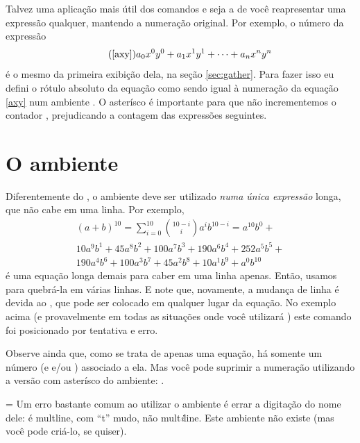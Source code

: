 \documentclass[a4paper,12pt]{amsart}
\newlength\atencaowidth
\newenvironment{atencao}{%
		\medskip%
		\noindent\hangindent=\atencaowidth\hangafter=-2%
		\hspace{-\atencaowidth}%
		\usebox{\atencaobox}\footnotesize
		\setlength\parindent\atencaowidth}{\par\medskip}
\begin{document}
	Talvez uma aplicação mais útil dos comandos  e  seja a de você reapresentar uma expressão qualquer, mantendo a numeração original. Por exemplo, o número da expressão
	\begin{equation*}\tag{\ref{axy}}
	a_0 x^0 y^0 + a_1 x^1 y^1 + \cdots + a_n x^n y^n
	\end{equation*}
	é o mesmo da primeira exibição dela, na seção \ref{sec:gather}. Para fazer isso eu defini o rótulo absoluto da equação como sendo igual à numeração da equação \ref{axy} num ambiente . O asterísco é importante para que não incrementemos o contador , prejudicando a contagem das expressões seguintes.
	
	\section{O ambiente }
	
	Diferentemente do , o ambiente  deve ser utilizado \emph{numa única expressão} longa, que não cabe em uma linha. Por exemplo,	
	\begin{multline}\label{eq:(a+b)^10}
		(a + b)^{10} = \sum_{i = 0}^{10} \binom{10 - i}{i} a^i b^{10 - i} =
		    a^{10} b^{ 0} + \\
		 10 a^{ 9} b^{ 1} +
		 45 a^{ 8} b^{ 2} +
		100 a^{ 7} b^{ 3} +
		190 a^{ 6} b^{ 4} +
		252 a^{ 5} b^{ 5} + \\
		190 a^{ 4} b^{ 6} +
		100 a^{ 3} b^{ 7} +
		 45 a^{ 2} b^{ 8} +
		 10 a^{ 1} b^{ 9} +
	      a^{ 0} b^{10}
	\end{multline}
	é uma equação longa demais para caber em uma linha apenas. Então, usamos  para quebrá-la em várias linhas. E note que, novamente, a mudança de linha é devida ao \cs{\textbackslash}, que pode ser colocado em qualquer lugar da equação. No exemplo acima (e provavelmente em todas as situações onde você utilizará ) este comando foi posicionado por tentativa e erro.
	
	Observe ainda que, como se trata de apenas uma equação, há somente um número (e  e/ou ) associado a ela. Mas você pode suprimir a numeração utilizando a versão com asterísco do ambiente: .
	
	\begin{atencao}%
	Um erro bastante comum ao utilizar o ambiente  é errar a digitação do nome dele: é multline, com ``t'' mudo, não mult\emph{i}line. Este ambiente não existe (mas você pode criá-lo, se quiser).
	\end{atencao}
	
\end{document}
